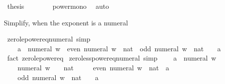 \begin{isabellebody}
\ {\isacharquery}{\kern0pt}thesis\isanewline
\ \ \ \ \ \ \isamarkupfalse%
\ power{\isacharunderscore}{\kern0pt}mono\ \isamarkupfalse%
\ auto\isanewline
\ \ \isamarkupfalse%
\isanewline
{}\isamarkupfalse%
%
\endisatagproof
{\isafoldproof}%
%
\isadelimproof
%
\endisadelimproof
%
\begin{isamarkuptext}%
Simplify, when the exponent is a numeral%
\end{isamarkuptext}\isamarkuptrue%
\isamarkupfalse%
\ zero{\isacharunderscore}{\kern0pt}le{\isacharunderscore}{\kern0pt}power{\isacharunderscore}{\kern0pt}eq{\isacharunderscore}{\kern0pt}numeral\ {\isacharbrackleft}{\kern0pt}simp{\isacharbrackright}{\kern0pt}{\isacharcolon}{\kern0pt}\isanewline
\ \ {\isachardoublequoteopen}{}\ {\isasymle}\ a\ {\isacharcircum}{\kern0pt}\ numeral\ w\ {\isasymlongleftrightarrow}\ even\ {\isacharparenleft}{\kern0pt}numeral\ w\ {\isacharcolon}{\kern0pt}{\isacharcolon}{\kern0pt}\ nat{\isacharparenright}{\kern0pt}\ {\isasymor}\ odd\ {\isacharparenleft}{\kern0pt}numeral\ w\ {\isacharcolon}{\kern0pt}{\isacharcolon}{\kern0pt}\ nat{\isacharparenright}{\kern0pt}\ {\isasymand}\ {}\ {\isasymle}\ a{\isachardoublequoteclose}\isanewline
%
\isadelimproof
\ \ %
\endisadelimproof
%
\isatagproof
{}\isamarkupfalse%
\ {\isacharparenleft}{\kern0pt}fact\ zero{\isacharunderscore}{\kern0pt}le{\isacharunderscore}{\kern0pt}power{\isacharunderscore}{\kern0pt}eq{\isacharparenright}{\kern0pt}%
\endisatagproof
{\isafoldproof}%
%
\isadelimproof
\isanewline
%
\endisadelimproof
\isanewline
{}\isamarkupfalse%
\ zero{\isacharunderscore}{\kern0pt}less{\isacharunderscore}{\kern0pt}power{\isacharunderscore}{\kern0pt}eq{\isacharunderscore}{\kern0pt}numeral\ {\isacharbrackleft}{\kern0pt}simp{\isacharbrackright}{\kern0pt}{\isacharcolon}{\kern0pt}\isanewline
\ \ {\isachardoublequoteopen}{}\ {\isacharless}{\kern0pt}\ a\ {\isacharcircum}{\kern0pt}\ numeral\ w\ {\isasymlongleftrightarrow}\isanewline
\ \ \ \ numeral\ w\ {\isacharequal}{\kern0pt}\ {\isacharparenleft}{\kern0pt}{}\ {\isacharcolon}{\kern0pt}{\isacharcolon}{\kern0pt}\ nat{\isacharparenright}{\kern0pt}\ {\isasymor}\isanewline
\ \ \ \ even\ {\isacharparenleft}{\kern0pt}numeral\ w\ {\isacharcolon}{\kern0pt}{\isacharcolon}{\kern0pt}\ nat{\isacharparenright}{\kern0pt}\ {\isasymand}\ a\ {\isasymnoteq}\ {}\ {\isasymor}\isanewline
\ \ \ \ odd\ {\isacharparenleft}{\kern0pt}numeral\ w\ {\isacharcolon}{\kern0pt}{\isacharcolon}{\kern0pt}\ nat{\isacharparenright}{\kern0pt}\ {\isasymand}\ {}\ {\isacharless}{\kern0pt}\ a{\isachardoublequoteclose}\isanewline

\end{isabellebody}
